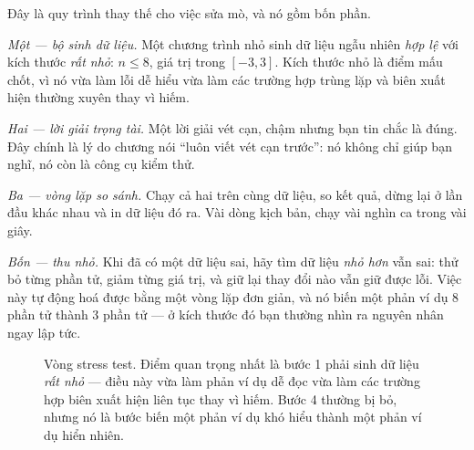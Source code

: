 \documentclass[../../algorithm.tex]{subfiles}
\begin{document}
Đây là quy trình thay thế cho việc sửa mò, và nó gồm bốn phần.

\emph{Một --- bộ sinh dữ liệu.} Một chương trình nhỏ sinh dữ liệu ngẫu nhiên \emph{hợp lệ} với kích thước \emph{rất nhỏ}: \(n \le 8\), giá trị trong \([-3,3]\). Kích thước nhỏ là điểm mấu chốt, vì nó vừa làm lỗi dễ hiểu vừa làm các trường hợp trùng lặp và biên xuất hiện thường xuyên thay vì hiếm.

\emph{Hai --- lời giải trọng tài.} Một lời giải vét cạn, chậm nhưng bạn tin chắc là đúng. Đây chính là lý do chương  nói ``luôn viết vét cạn trước'': nó không chỉ giúp bạn nghĩ, nó còn là công cụ kiểm thử.

\emph{Ba --- vòng lặp so sánh.} Chạy cả hai trên cùng dữ liệu, so kết quả, dừng lại ở lần đầu khác nhau và in dữ liệu đó ra. Vài dòng kịch bản, chạy vài nghìn ca trong vài giây.

\emph{Bốn --- thu nhỏ.} Khi đã có một dữ liệu sai, hãy tìm dữ liệu \emph{nhỏ hơn} vẫn sai: thử bỏ từng phần tử, giảm từng giá trị, và giữ lại thay đổi nào vẫn giữ được lỗi. Việc này tự động hoá được bằng một vòng lặp đơn giản, và nó biến một phản ví dụ 8 phần tử thành 3 phần tử --- ở kích thước đó bạn thường nhìn ra nguyên nhân ngay lập tức.

\begin{figure}[H]\centering
{}
\caption{Vòng stress test. Điểm quan trọng nhất là bước 1 phải sinh dữ liệu \emph{rất nhỏ} --- điều này vừa làm phản ví dụ dễ đọc vừa làm các trường hợp biên xuất hiện liên tục thay vì hiếm. Bước 4 thường bị bỏ, nhưng nó là bước biến một phản ví dụ khó hiểu thành một phản ví dụ hiển nhiên.}
\label{fig:stress}
\end{figure}
\end{document}
